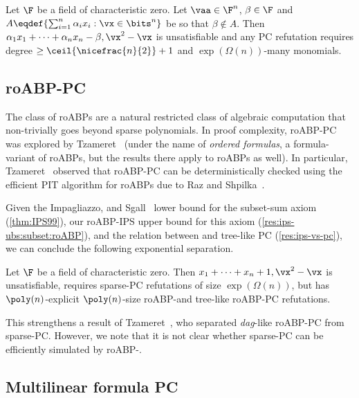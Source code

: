 \documentclass[11pt]{article}
\numberwithin{equation}{section}
\theoremstyle{definition}
\theoremstyle{plain}
\begin{document}
\begin{theoremwp}\label{thm:IPS99}
        Let $\F$ be a field of characteristic zero. Let $\vaa\in\F^n$, $\beta\in\F$ and $A\eqdef\{\sum_{i=1}^n \alpha_i x_i : \vx\in\bits^n\}$ be so that $\beta\notin A$. Then $\alpha_1x_1+\cdots+\alpha_nx_n-\beta,\vx^2-\vx$ is unsatisfiable and any PC refutation requires degree $\ge\ceil{\nicefrac{n}{2}}+1$ and $\exp(\Omega(n))$-many monomials.
\end{theoremwp}

\subsection{roABP-PC}

The class of roABPs are a natural restricted class of algebraic computation that non-trivially goes beyond sparse polynomials.  In proof complexity, roABP-PC was explored by Tzameret~\cite{Tzameret11} (under the name of \emph{ordered formulas}, a formula-variant of roABPs, but the results there apply to roABPs as well).  In particular, Tzameret~\cite{Tzameret11} observed that roABP-PC can be deterministically checked using the efficient PIT algorithm for roABPs due to Raz and Shpilka~\cite{RazShpilka05}.

Given the Impagliazzo, \Pudlak and Sgall~\cite{IPS99} lower bound for the subset-sum axiom (\autoref{thm:IPS99}), our roABP-IPS upper bound for this axiom (\autoref{res:ips-ubs:subset:roABP}), and the relation between \lIPS and tree-like PC (\autoref{res:ips-vs-pc}), we can conclude the following exponential separation.

\begin{corollarywp}
        Let $\F$ be a field of characteristic zero. Then $x_1+\cdots+x_n+1,\vx^2-\vx$ is unsatisfiable, requires sparse-PC refutations of
%
size $\exp(\Omega(n))$,    %
but has $\poly(n)$-explicit $\poly(n)$-size roABP-\lIPS and tree-like roABP-PC refutations.
\end{corollarywp}

This strengthens a result of Tzameret~\cite{Tzameret11}, who separated \emph{dag}-like roABP-PC from sparse-PC\@. However, we note that it is not clear whether sparse-PC can be efficiently simulated by roABP-\lIPS.

\subsection{Multilinear formula PC}
\end{document}
